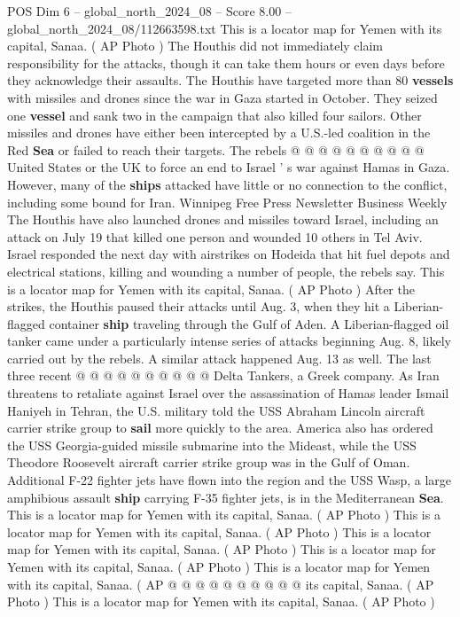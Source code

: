 \begin{textsample}{POS Dim 6 – global\_north\_2024\_08 – Score 8.00 – global\_north\_2024\_08/112663598.txt}
This is a locator map for Yemen with its capital, Sanaa. ( AP Photo ) The Houthis did not immediately claim responsibility for the attacks, though it can take them hours or even days before they acknowledge their assaults.
The Houthis have targeted more than 80 \textbf{vessels} with missiles and drones since the war in Gaza started in October.
They seized one \textbf{vessel} and sank two in the campaign that also killed four sailors.
Other missiles and drones have either been intercepted by a U.S.-led coalition in the Red \textbf{Sea} or failed to reach their targets.
The rebels @ @ @ @ @ @ @ @ @ @ United States or the UK to force an end to Israel ' s war against Hamas in Gaza.
However, many of the \textbf{ships} attacked have little or no connection to the conflict, including some bound for Iran.
Winnipeg Free Press Newsletter Business Weekly The Houthis have also launched drones and missiles toward Israel, including an attack on July 19 that killed one person and wounded 10 others in Tel Aviv.
Israel responded the next day with airstrikes on Hodeida that hit fuel depots and electrical stations, killing and wounding a number of people, the rebels say.
This is a locator map for Yemen with its capital, Sanaa. ( AP Photo ) After the strikes, the Houthis paused their attacks until Aug. 3, when they hit a Liberian-flagged container \textbf{ship} traveling through the Gulf of Aden.
A Liberian-flagged oil tanker came under a particularly intense series of attacks beginning Aug. 8, likely carried out by the rebels.
A similar attack happened Aug. 13 as well.
The last three recent @ @ @ @ @ @ @ @ @ @ Delta Tankers, a Greek company.
As Iran threatens to retaliate against Israel over the assassination of Hamas leader Ismail Haniyeh in Tehran, the U.S. military told the USS Abraham Lincoln aircraft carrier strike group to \textbf{sail} more quickly to the area.
America also has ordered the USS Georgia-guided missile submarine into the Mideast, while the USS Theodore Roosevelt aircraft carrier strike group was in the Gulf of Oman.
Additional F-22 fighter jets have flown into the region and the USS Wasp, a large amphibious assault \textbf{ship} carrying F-35 fighter jets, is in the Mediterranean \textbf{Sea}.
This is a locator map for Yemen with its capital, Sanaa. ( AP Photo ) This is a locator map for Yemen with its capital, Sanaa. ( AP Photo ) This is a locator map for Yemen with its capital, Sanaa. ( AP Photo ) This is a locator map for Yemen with its capital, Sanaa. ( AP Photo ) This is a locator map for Yemen with its capital, Sanaa. ( AP @ @ @ @ @ @ @ @ @ @ its capital, Sanaa. ( AP Photo ) This is a locator map for Yemen with its capital, Sanaa. ( AP Photo )

\end{textsample}
